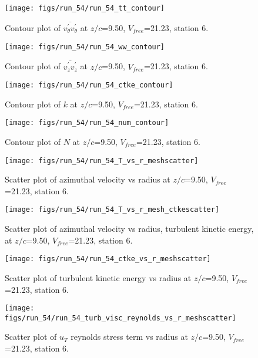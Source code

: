 \begin{figure}[H]
\centering
\texttt{[image: figs/run\_54/run\_54\_tt\_contour]}
\caption{Contour plot of $\overline{v_{\theta}^{\prime} v_{\theta}^{\prime}}$ at $z/c$=9.50, $V_{free}$=21.23, station 6.}
\end{figure}


\begin{figure}[H]
\centering
\texttt{[image: figs/run\_54/run\_54\_ww\_contour]}
\caption{Contour plot of $\overline{v_{z}^{\prime} v_{z}^{\prime}}$ at $z/c$=9.50, $V_{free}$=21.23, station 6.}
\end{figure}


\begin{figure}[H]
\centering
\texttt{[image: figs/run\_54/run\_54\_ctke\_contour]}
\caption{Contour plot of $k$ at $z/c$=9.50, $V_{free}$=21.23, station 6.}
\end{figure}


\begin{figure}[H]
\centering
\texttt{[image: figs/run\_54/run\_54\_num\_contour]}
\caption{Contour plot of $N$ at $z/c$=9.50, $V_{free}$=21.23, station 6.}
\end{figure}


\begin{figure}[H]
\centering
\texttt{[image: figs/run\_54/run\_54\_T\_vs\_r\_meshscatter]}
\caption{Scatter plot of azimuthal velocity vs radius at $z/c$=9.50, $V_{free}$=21.23, station 6.}
\end{figure}


\begin{figure}[H]
\centering
\texttt{[image: figs/run\_54/run\_54\_T\_vs\_r\_mesh\_ctkescatter]}
\caption{Scatter plot of azimuthal velocity vs radius, turbulent kinetic energy, at $z/c$=9.50, $V_{free}$=21.23, station 6.}
\end{figure}


\begin{figure}[H]
\centering
\texttt{[image: figs/run\_54/run\_54\_ctke\_vs\_r\_meshscatter]}
\caption{Scatter plot of turbulent kinetic energy vs radius at $z/c$=9.50, $V_{free}$=21.23, station 6.}
\end{figure}


\begin{figure}[H]
\centering
\texttt{[image: figs/run\_54/run\_54\_turb\_visc\_reynolds\_vs\_r\_meshscatter]}
\caption{Scatter plot of $
u_T$ reynolds stress term vs radius at $z/c$=9.50, $V_{free}$=21.23, station 6.}
\end{figure}


